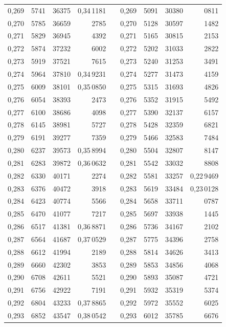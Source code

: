 \begin{tabular}{|c|c|c|r|@{}p{9pt}@{}|c|c|c|r|}
0,269 & 5741 & 36375 & 0,34\,1181 &  & 0,269 & 5091 & 30380 & 0811 \\
0,270 & 5785 & 36659 & 2785 &  & 0,270 & 5128 & 30597 & 1482 \\[3pt]
0,271 & 5829 & 36945 & 4392 &  & 0,271 & 5165 & 30815 & 2153 \\
0,272 & 5874 & 37232 & 6002 &  & 0,272 & 5202 & 31033 & 2822 \\
0,273 & 5919 & 37521 & 7615 &  & 0,273 & 5240 & 31253 & 3491 \\
0,274 & 5964 & 37810 & 0,34\,9231 &  & 0,274 & 5277 & 31473 & 4159 \\
0,275 & 6009 & 38101 & 0,35\,0850 &  & 0,275 & 5315 & 31693 & 4826 \\[3pt]
0,276 & 6054 & 38393 & 2473 &  & 0,276 & 5352 & 31915 & 5492 \\
0,277 & 6100 & 38686 & 4098 &  & 0,277 & 5390 & 32137 & 6157 \\
0,278 & 6145 & 38981 & 5727 &  & 0,278 & 5428 & 32359 & 6821 \\
0,279 & 6191 & 39277 & 7359 &  & 0,279 & 5466 & 32583 & 7484 \\
0,280 & 6237 & 39573 & 0,35\,8994 &  & 0,280 & 5504 & 32807 & 8147 \\[3pt]
0,281 & 6283 & 39872 & 0,36\,0632 &  & 0,281 & 5542 & 33032 & 8808 \\
0,282 & 6330 & 40171 & 2274 &  & 0,282 & 5581 & 33257 & 0,22\,9469 \\
0,283 & 6376 & 40472 & 3918 &  & 0,283 & 5619 & 33484 & 0,23\,0128 \\
0,284 & 6423 & 40774 & 5566 &  & 0,284 & 5658 & 33711 & 0787 \\
0,285 & 6470 & 41077 & 7217 &  & 0,285 & 5697 & 33938 & 1445 \\[3pt]
0,286 & 6517 & 41381 & 0,36\,8871 &  & 0,286 & 5736 & 34167 & 2102 \\
0,287 & 6564 & 41687 & 0,37\,0529 &  & 0,287 & 5775 & 34396 & 2758 \\
0,288 & 6612 & 41994 & 2189 &  & 0,288 & 5814 & 34626 & 3413 \\
0,289 & 6660 & 42302 & 3853 &  & 0,289 & 5853 & 34856 & 4068 \\
0,290 & 6708 & 42611 & 5521 &  & 0,290 & 5893 & 35087 & 4721 \\[3pt]
0,291 & 6756 & 42922 & 7191 &  & 0,291 & 5932 & 35319 & 5374 \\
0,292 & 6804 & 43233 & 0,37\,8865 &  & 0,292 & 5972 & 35552 & 6025 \\
0,293 & 6852 & 43547 & 0,38\,0542 &  & 0,293 & 6012 & 35785 & 6676 \\

\end{tabular}
